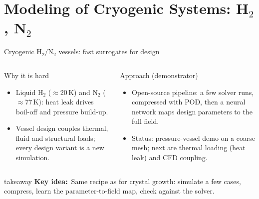 \documentclass[aspectratio=169,10pt,t]{beamer}
\newcommand{\takeaway}[1]{%
  \par\vfill
  \begin{beamercolorbox}[wd=\linewidth,sep=5pt,rounded=true]{takeaway}
    \small\textcolor{qblue}{\textbf{Key idea:}}~#1
  \end{beamercolorbox}\vspace{1mm}}
\begin{document}
\section{Modeling of Cryogenic Systems: H$_2$, N$_2$}
\begin{frame}{Cryogenic H$_2$/N$_2$ vessels: fast surrogates for design}
\begin{columns}[T,onlytextwidth]
\begin{block}{Why it is hard}
\begin{itemize}\footnotesize
  \item Liquid H$_2$ ($\approx$20\,K) and N$_2$ ($\approx$77\,K): heat leak drives boil-off and pressure build-up.
  \item Vessel design couples thermal, fluid and structural loads; every design variant is a new simulation.
\end{itemize}
\end{block}
\begin{block}{Approach (demonstrator)}
\begin{itemize}\footnotesize
  \item Open-source pipeline: a few solver runs, compressed with POD, then a neural network maps design parameters to the full field.
  \item Status: pressure-vessel demo on a coarse mesh; next are thermal loading (heat leak) and CFD coupling.
\end{itemize}
\end{block}
\centering
{}
\end{columns}
\takeaway{Same recipe as for crystal growth: simulate a few cases, compress, learn the parameter-to-field map, check against the solver.}
\end{frame}
\end{document}
